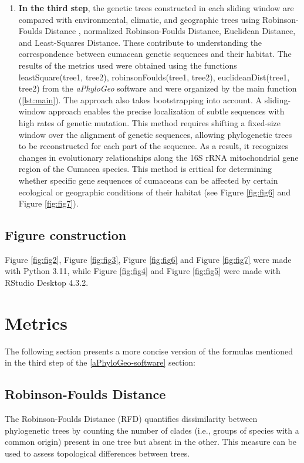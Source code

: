 \begin{enumerate}
\item \textbf{In the third step}, the genetic trees constructed in each sliding window are compared with environmental, climatic, and geographic trees using Robinson-Foulds Distance \citep{robinson_comparison_1981, koshkarov_phylogeography_2022}, normalized Robinson-Foulds Distance, Euclidean Distance, and Least-Squares Distance. These contribute to understanding the correspondence between cumacean genetic sequences and their habitat. The results of the metrics used were obtained using the functions leastSquare(tree1, tree2), robinsonFoulds(tree1, tree2), euclideanDist(tree1, tree2) from the \textit{aPhyloGeo} software and were organized by the main function (\autoref{lst:main}). The approach also takes bootstrapping into account. A sliding-window approach enables the precise localization of subtle sequences with high rates of genetic mutation. This method requires shifting a fixed-size window over the alignment of genetic sequences, allowing phylogenetic trees to be reconstructed for each part of the sequence. As a result, it recognizes changes in evolutionary relationships along the 16S rRNA mitochondrial gene region of the Cumacea species. This method is critical for determining whether specific gene sequences of cumaceans can be affected by certain ecological or geographic conditions of their habitat (see Figure \ref{fig:fig6} and Figure \ref{fig:fig7}).
\end{enumerate}

\subsection{Figure construction}
Figure \ref{fig:fig2}, Figure \ref{fig:fig3}, Figure \ref{fig:fig6} and Figure \ref{fig:fig7} were made with Python 3.11, while Figure \ref{fig:fig4} and Figure \ref{fig:fig5} were made with RStudio Desktop 4.3.2.

\section{Metrics}\label{metrics}
The following section presents a more concise version of the formulas mentioned in the third step of the \autoref{aPhyloGeo-software} section:

\subsection{Robinson-Foulds Distance}\label{RF}

The Robinson-Foulds Distance (RFD) quantifies dissimilarity between phylogenetic trees by counting the number of clades  (i.e., groups of species with a common origin) present in one tree but absent in the other. This measure can be used to assess topological differences between trees. 

